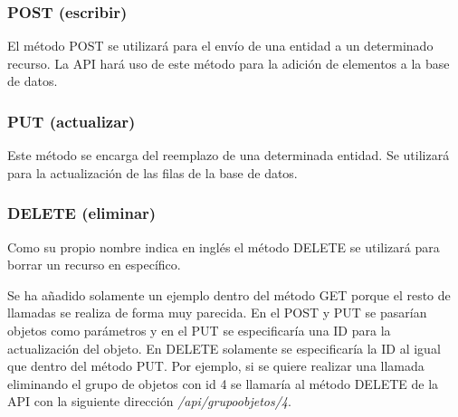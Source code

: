 \subsubsection{POST (escribir)}
El método POST se utilizará para el envío de una entidad a un determinado recurso. La API hará uso de este método para la adición de elementos a la base de datos.

\subsubsection{PUT (actualizar)}
Este método se encarga del reemplazo de una determinada entidad. Se utilizará para la actualización de las filas de la base de datos.

\subsubsection{DELETE (eliminar)}
Como su propio nombre indica en inglés el método DELETE se utilizará para borrar un recurso en específico.

\vspace{\baselineskip}
Se ha añadido solamente un ejemplo dentro del método GET porque el resto de llamadas se realiza de forma muy parecida. En el POST y PUT se pasarían objetos como parámetros y en el PUT se especificaría una ID para la actualización del objeto. En DELETE solamente se especificaría la ID al igual que dentro del método PUT. Por ejemplo, si se quiere realizar una llamada eliminando el grupo de objetos con id 4 se llamaría al método DELETE de la API con la siguiente dirección \textit{/api/grupoobjetos/4}.

